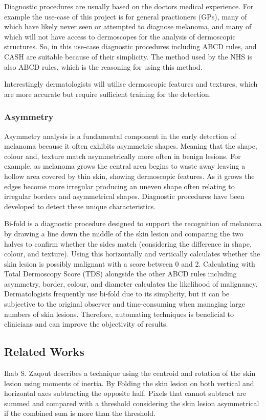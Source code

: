 Diagnostic procedures are usually based on the doctors medical experience. For example the use-case of this project is for general practioners (GPs), many of which have likely never seen or attempted to diagnose melanoma, and many of which will not have access to dermoscopes for the analysis of dermoscopic structures. So, in this use-case diagnostic procedures including ABCD rules, and CASH are suitable because of their simplicity. The method used by the NHS is also ABCD rules, which is the reasoning for using this method. 

Interestingly dermatologists will utilise dermoscopic features and textures, which are more accurate but require sufficient training for the detection.

\subsubsection{Asymmetry}
Asymmetry analysis is a fundamental component in the early detection of melanoma because it often exhibits asymmetric shapes\cite{Ali2020a}. Meaning that the shape, colour and, texture match asymmetrically more often in benign lesions. For example, as melanoma grows the central area begins to waste away leaving a hollow area covered by thin skin, showing dermoscopic features. As it grows the edges become more irregular producing an uneven shape often relating to irregular borders and asymmetrical shapes. Diagnostic procedures have been developed to detect these unique characteristics.

Bi-fold is a diagnostic procedure designed to support the recognition of melanoma by drawing a line down the middle of the skin lesion and comparing the two halves to confirm whether the sides match (considering the difference in shape, colour, and texture). Using this horizontally and vertically calculates whether the skin lesion is possibly malignant with a score between 0 and 2. Calculating with Total Dermoscopy Score (TDS) alongside the other ABCD rules including asymmetry, border, colour, and diameter calculates the likelihood of malignancy. Dermatologists frequently use bi-fold due to its simplicity, but it can be subjective to the original observer and time-consuming when managing large numbers of skin lesions. Therefore, automating techniques is beneficial to clinicians and can improve the objectivity of results.

\subsection{Related Works}
Ihab S. Zaqout\cite{Zaqout2016} describes a technique using the centroid and rotation of the skin lesion using moments of inertia. By Folding the skin lesion on both vertical and horizontal axes subtracting the opposite half. Pixels that cannot subtract are summed and compared with a threshold considering the skin lesion asymmetrical if the combined sum is more than the threshold.

